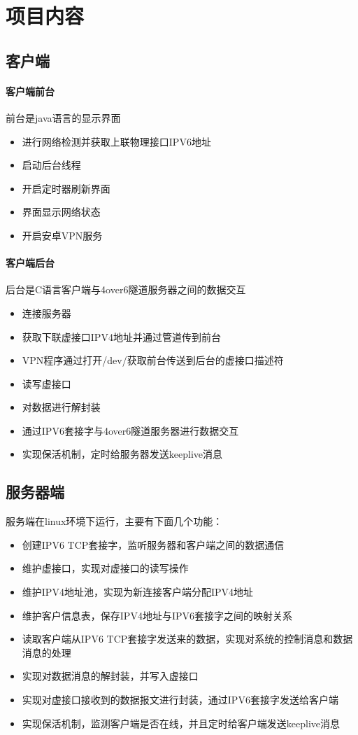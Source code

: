 \chapter{项目内容}

\section{客户端}

\subsubsection{客户端前台}
前台是java语言的显示界面
\begin{itemize}
    \item 进行网络检测并获取上联物理接口IPV6地址
    \item 启动后台线程
    \item 开启定时器刷新界面
    \item 界面显示网络状态
    \item 开启安卓VPN服务
\end{itemize}
\subsubsection{客户端后台}
后台是C语言客户端与4over6隧道服务器之间的数据交互
\begin{itemize}
    \item 连接服务器
    \item 获取下联虚接口IPV4地址并通过管道传到前台
    \item VPN程序通过打开/dev/获取前台传送到后台的虚接口描述符
    \item 读写虚接口
    \item 对数据进行解封装
    \item 通过IPV6套接字与4over6隧道服务器进行数据交互
    \item 实现保活机制，定时给服务器发送keeplive消息
\end{itemize}

\section{服务器端}
服务端在linux环境下运行，主要有下面几个功能：
\begin{itemize}
    \item 创建IPV6 TCP套接字，监听服务器和客户端之间的数据通信
    \item 维护虚接口，实现对虚接口的读写操作
    \item 维护IPV4地址池，实现为新连接客户端分配IPV4地址
    \item 维护客户信息表，保存IPV4地址与IPV6套接字之间的映射关系
    \item 读取客户端从IPV6 TCP套接字发送来的数据，实现对系统的控制消息和数据消息的处理
    \item 实现对数据消息的解封装，并写入虚接口
    \item 实现对虚接口接收到的数据报文进行封装，通过IPV6套接字发送给客户端
    \item 实现保活机制，监测客户端是否在线，并且定时给客户端发送keeplive消息
\end{itemize}